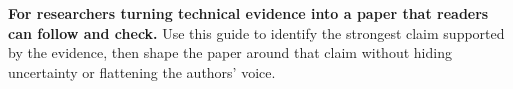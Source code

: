 \noindent
\textbf{For researchers turning technical evidence into a paper that readers
can follow and check.} Use this guide to identify the strongest claim
supported by the evidence, then shape the paper around that claim without
hiding uncertainty or flattening the authors' voice.
